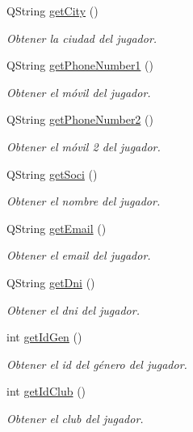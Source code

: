 \begin{DoxyCompactItemize}
Q\+String \mbox{\hyperlink{classjugador_a326f8dd3d47d3fa8fdb7b38b27c47bc8}{get\+City}} ()
\begin{DoxyCompactList}\small\item\em Obtener la ciudad del jugador. \end{DoxyCompactList}\item 
Q\+String \mbox{\hyperlink{classjugador_a9bf1e0a307861344a0912d21ec4bf5a9}{get\+Phone\+Number1}} ()
\begin{DoxyCompactList}\small\item\em Obtener el móvil del jugador. \end{DoxyCompactList}\item 
Q\+String \mbox{\hyperlink{classjugador_aa6bbb640f9c687cebedcd442b96e5f76}{get\+Phone\+Number2}} ()
\begin{DoxyCompactList}\small\item\em Obtener el móvil 2 del jugador. \end{DoxyCompactList}\item 
Q\+String \mbox{\hyperlink{classjugador_a03b468db718824916d7f6d47e46e708b}{get\+Soci}} ()
\begin{DoxyCompactList}\small\item\em Obtener el nombre del jugador. \end{DoxyCompactList}\item 
Q\+String \mbox{\hyperlink{classjugador_a65a647a2c1beedbb2dc2e4b6847bff69}{get\+Email}} ()
\begin{DoxyCompactList}\small\item\em Obtener el email del jugador. \end{DoxyCompactList}\item 
Q\+String \mbox{\hyperlink{classjugador_ac9609bf100bfb43e2e9582a8e69abdb5}{get\+Dni}} ()
\begin{DoxyCompactList}\small\item\em Obtener el dni del jugador. \end{DoxyCompactList}\item 
int \mbox{\hyperlink{classjugador_adb2f8c9bba1afa83be6ebf6a651769b2}{get\+Id\+Gen}} ()
\begin{DoxyCompactList}\small\item\em Obtener el id del género del jugador. \end{DoxyCompactList}\item 
int \mbox{\hyperlink{classjugador_a0538f173119697d49b6bfc95c9558580}{get\+Id\+Club}} ()
\begin{DoxyCompactList}\small\item\em Obtener el club del jugador. \end{DoxyCompactList}\item 

\end{DoxyCompactItemize}
